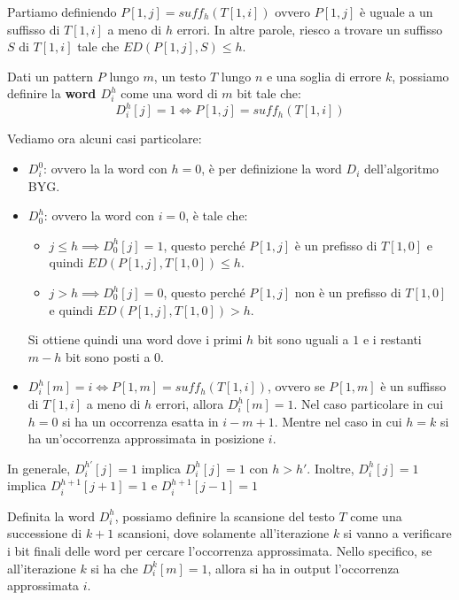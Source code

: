 Partiamo definiendo $P[1, j] = suff_h(T[1, i])$ ovvero $P[1, j]$ è uguale a un
suffisso di $T[1, i]$ a meno di $h$ errori. In altre parole, riesco a trovare un
suffisso $S$ di $T[1, i]$ tale che $ED(P[1, j], S) \leq h$.
\begin{definizione}
    Dati un pattern $P$ lungo $m$, un testo $T$ lungo $n$ e una soglia di errore $k$,
    possiamo definire la \textbf{word $D_i^h$} come una word di $m$ bit tale che:
    \begin{equation}
        D_i^h[j] = 1 \iff P[1, j] = suff_h(T[1, i])
    \end{equation}
\end{definizione}
Vediamo ora alcuni casi particolare:
\begin{itemize}
    \item $D_i^0$: ovvero la la word con $h = 0$, è per definizione la word $D_i$
          dell'algoritmo BYG.
    \item $D_0^h$: ovvero la word con $i = 0$, è tale che:
          \begin{itemize}
              \item $j \leq h \implies D_0^h[j] = 1$, questo perché $P[1, j]$ è un
                    prefisso di $T[1, 0]$ e quindi $ED(P[1, j], T[1, 0]) \leq h$.
              \item $j > h \implies D_0^h[j] = 0$, questo perché $P[1, j]$ non è un
                    prefisso di $T[1, 0]$ e quindi $ED(P[1, j], T[1, 0]) > h$.
          \end{itemize}
          Si ottiene quindi una word dove i primi $h$ bit sono uguali a $1$ e i
          restanti $m - h$ bit sono posti a $0$.
    \item $D_i^h [m] = i \iff P[1, m] = suff_h(T[1, i])$, ovvero se $P[1, m]$ è un
          suffisso di $T[1, i]$ a meno di $h$ errori, allora $D_i^h[m] = 1$. Nel
          caso particolare in cui $h = 0$ si ha un occorrenza esatta in $i - m + 1$.
          Mentre nel caso in cui $h = k$ si ha un'occorrenza approssimata in posizione $i$.
\end{itemize}
\begin{nota}
    In generale, $D_i^{h'}[j] = 1$ implica $D_i^{h}[j] = 1$ con $h > h'$. Inoltre,
    $D_{i}^{h} [j] = 1$ implica $D_{i}^{h + 1}[j + 1] = 1$ e $D_{i}^{h + 1}[j - 1] = 1$
\end{nota}
Definita la word $D_i^h$, possiamo definire la scansione del testo $T$ come una
successione di $k + 1$ scansioni, dove solamente all'iterazione $k$ si vanno a
verificare i bit finali delle word per cercare l'occorrenza approssimata.
Nello specifico, se all'iterazione $k$ si ha che $D_i^k[m] = 1$, allora si ha in
output l'occorrenza approssimata $i$.

